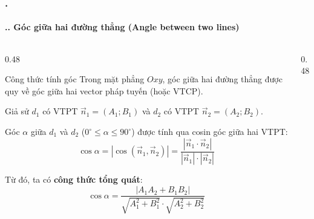 \documentclass[11pt, aspectratio=169]{beamer}
\begin{document}
\begin{frame}[fragile]
    \frametitle{\thesection. \insertsection}
    \framesubtitle{\thesection.\thesubsection. Góc giữa hai đường thẳng (Angle between two lines)}
    \vspace{-0.5cm}
    \begin{columns}[T, onlytextwidth]
        \begin{column}{0.48\textwidth}
            \begin{block}{Công thức tính góc}
                \footnotesize
                Trong mặt phẳng $Oxy$, góc giữa hai đường thẳng được quy về góc giữa hai vector pháp tuyến (hoặc VTCP).
                
                Giả sử $d_1$ có VTPT $\vec{n}_1 = (A_1; B_1)$ và $d_2$ có VTPT $\vec{n}_2 = (A_2; B_2)$. 
                
                Góc $\alpha$ giữa $d_1$ và $d_2$ ($0^\circ \le \alpha \le 90^\circ$) được tính qua cosin góc giữa hai VTPT:
                \vspace{-0.15cm} %
                \[
                    \cos \alpha = |\cos(\vec{n}_1, \vec{n}_2)| = \frac{|\vec{n}_1 \cdot \vec{n}_2|}{|\vec{n}_1| \cdot |\vec{n}_2|}
                \]
                \vspace{-0.15cm}
                
                Từ đó, ta có \textbf{công thức tổng quát}:
                \[
                    \boxed{ \cos \alpha = \frac{|A_1A_2 + B_1B_2|}{\sqrt{A_1^2 + B_1^2} \cdot \sqrt{A_2^2 + B_2^2}} }
                \]
            \end{block}
        \end{column}
        
        \begin{column}{0.48\textwidth}
            \centering
            \vspace{0.1cm}
\end{column}
\end{columns}
\end{frame}
\end{document}

